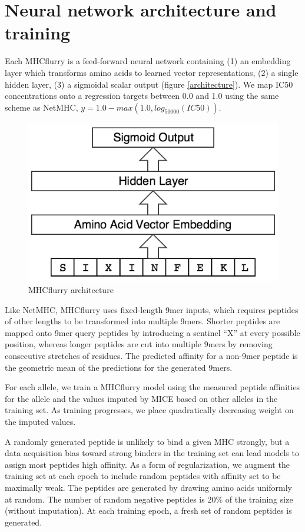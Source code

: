 \section{Neural network architecture and training}
Each MHCflurry is a feed-forward neural network containing (1) an embedding layer which transforms amino acids to learned vector representations, (2) a single hidden layer, (3) a sigmoidal scalar output (figure \ref{architecture}). We map IC50 concentrations onto a regression targets between 0.0 and 1.0 using the same scheme as NetMHC, $y = 1.0 - max(1.0, log_{50000}(IC50))$.

\begin{figure}[h]
\centering
\includegraphics[scale=0.25]{figures/mhcflurry-gliffy-network.png}
\caption{MHCflurry architecture}
\label{fig:architecture}
\end{figure}

Like NetMHC\cite{lundegaard2008accurate}, MHCflurry uses fixed-length 9mer inputs, which requires peptides of other lengths to be transformed into multiple 9mers. Shorter peptides are mapped onto 9mer query peptides by introducing a sentinel ``X'' at every possible position, whereas longer peptides are cut into multiple 9mers by removing consecutive stretches of residues. The predicted affinity for a non-9mer peptide is the geometric mean of the predictions for the generated 9mers. 

For each allele, we train a MHCflurry model using the measured peptide affinities for the allele and the values imputed by MICE based on other alleles in the training set. As training progresses, we place quadratically decreasing weight on the imputed values.

A randomly generated peptide is unlikely to bind a given MHC strongly, but a data acquisition bias toward strong binders in the training set can lead models to assign most peptides high affinity. As a form of regularization, we augment the training set at each epoch to include random peptides with affinity set to be maximally weak. The peptides are generated by drawing amino acids uniformly at random. The number of random negative peptides is 20\% of the training size (without imputation). At each training epoch, a fresh set of random peptides is generated.

